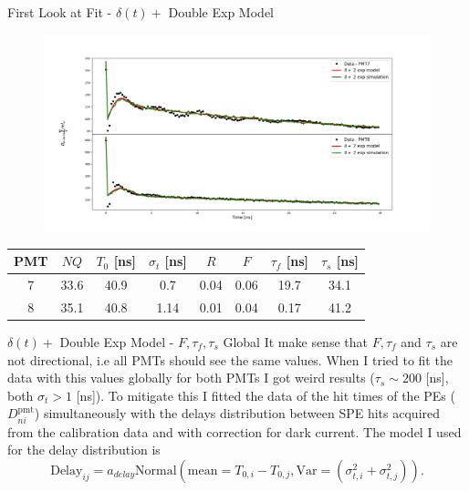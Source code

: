 \documentclass{beamer}
\begin{document}
\begin{frame}{First Look at Fit - $\delta(t)+$ Double Exp Model}
\begin{figure}[h]
\includegraphics[width=1\textwidth]{fit2.png}
\end{figure}

\begin{center}
\begin{tabular}{|c||c|c|c|c|c|c|c|} 
\hline
PMT & $NQ$ & $T_0$ [ns]& $\sigma_t$ [ns] & $R$ & $F$ & $\tau_f$ [ns] & $\tau_s$ [ns]\\ 
\hline\hline
7 & 33.6 & 40.9 & 0.7 & 0.04 & 0.06 & 19.7 & 34.1 \\
\hline
8 & 35.1 & 40.8 & 1.14 & 0.01 & 0.04 & 0.17 & 41.2\\
\hline
\end{tabular}
\end{center}

\end{frame}

\begin{frame}{$\delta(t)+$ Double Exp Model - $F, \tau_f, \tau_s$ Global}
It make sense that $F, \tau_f$ and $\tau_s$ are not directional, i.e all PMTs should see the same values. When I tried to fit the data with this values globally for both PMTs I got weird results ($\tau_s\sim200$ [ns], both $\sigma_t>1$ [ns]). To mitigate this I fitted the data of the hit times of the PEs ($D^{\text{pmt}}_{ni}$) simultaneously with the delays distribution between SPE hits acquired from the calibration data and with correction for dark current. The model I used for the delay distribution is
\begin{equation}
\text{Delay}_{ij}=a_{delay}\text{Normal}\left(\text{mean}=T_{0,i}-T_{0,j}, \text{Var}=\left(\sigma_{t,i}^2+\sigma_{t,j}^2\right)\right).
\end{equation}

\end{frame}
\end{document}
